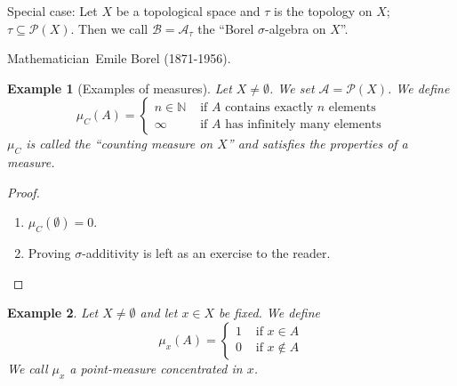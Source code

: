\documentclass{article}
\newtheorem{example}{Example}  \numberwithin{example}{section}
\newcommand{\person}[1]{Mathematician~#1.}
\begin{document}
Special case: Let $X$ be a topological space and $\tau$ is the topology on $X$; $\tau \subseteq \mathcal P(X)$.
Then we call $\mathcal B = \mathcal A_{\tau}$ the \enquote{Borel $\sigma$-algebra on $X$}.

\person{Emile Borel (1871-1956)}

\begin{example}[Examples of measures]
  Let $X \neq \emptyset$. We set $\mathcal A = \mathcal P(X)$.
  We define
  \[
    \mu_{C}(A) = \begin{cases}
      n \in \mathbb N & \text{ if } A \text{ contains exactly $n$ elements} \\
      \infty & \text{ if } A \text{ has infinitely many elements}
    \end{cases}
  \]
  $\mu_C$ is called the \enquote{counting measure on $X$} and satisfies the properties of a measure.
\end{example}

\begin{proof}
  \begin{enumerate}
    \item
      $\mu_C(\emptyset) = 0$.
    \item
      Proving $\sigma$-additivity is left as an exercise to the reader.
  \end{enumerate}
\end{proof}

\begin{example}
  Let $X \neq \emptyset$ and let $x \in X$ be fixed. We define
  \[ \mu_x(A) = \begin{cases} 1 & \text{ if } x \in A \\ 0 & \text{ if } x \not\in A \end{cases} \]
  We call $\mu_{x}$ a point-measure concentrated in $x$.
\end{example}
\end{document}
